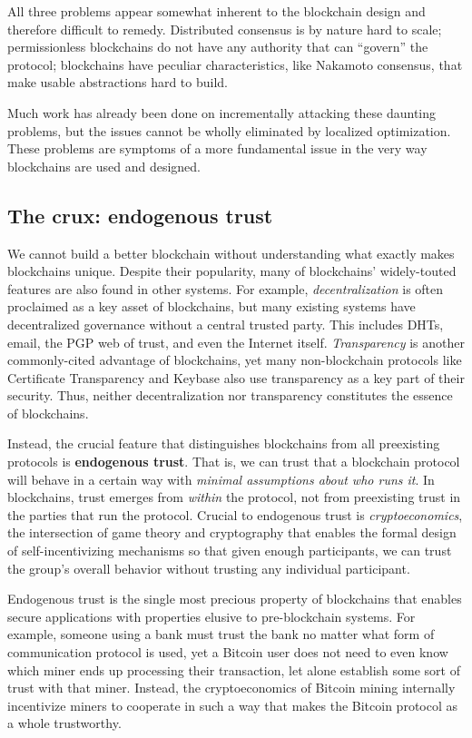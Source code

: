 \documentclass[headinclude,12pt]{scrbook}
\begin{document}
All three problems appear somewhat inherent to the blockchain design and therefore difficult to remedy. Distributed consensus is by nature hard to scale; permissionless blockchains do not have any authority that can ``govern'' the protocol; blockchains have peculiar characteristics, like Nakamoto consensus, that make usable abstractions hard to build.

Much work has already been done on incrementally attacking these daunting problems, but the issues cannot be wholly eliminated by localized optimization. These problems are symptoms of a more fundamental issue in the very way blockchains are used and designed.


\subsection{The crux: endogenous trust}


We cannot build a better blockchain without understanding what exactly makes blockchains unique. Despite their popularity, many of block\-chains' widely-touted features are also found in other systems. For example, \emph{decentralization} is often proclaimed as a key asset of blockchains, but many existing systems have decentralized governance without a central trusted party. This includes DHTs, email, the PGP web of trust, and even the Internet itself. \emph{Transparency} is another commonly-cited advantage of blockchains, yet many non-blockchain protocols like Certificate Transparency and Keybase also use transparency as a key part of their security. Thus, neither decentralization nor transparency constitutes the essence of blockchains.

Instead, the crucial feature that distinguishes blockchains from all preexisting protocols is \textbf{endogenous trust}. That is, we can trust that a blockchain protocol will behave in a certain way with \emph{minimal assumptions about who runs it}. In blockchains, trust emerges from \emph{within} the protocol, not from preexisting trust in the parties that run the protocol. Crucial to endogenous trust is \emph{cryptoeconomics}, the intersection of game theory and cryptography that enables the formal design of self-incentivizing mechanisms so that given enough participants, we can trust the group's overall behavior without trusting any individual participant.

Endogenous trust is the single most precious property of blockchains that enables secure applications with properties elusive to pre-blockchain systems. For example, someone using a bank must trust the bank no matter what form of communication protocol is used, yet a Bitcoin user does not need to even know which miner ends up processing their transaction, let alone establish some sort of trust with that miner. Instead, the cryptoeconomics of Bitcoin mining internally incentivize miners to cooperate in such a way that makes the Bitcoin protocol as a whole trustworthy.
\end{document}
